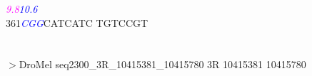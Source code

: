\documentclass[11pt,twoside,reqno,a4paper]{article}
\begin{document}
{\hspace*{4\charwidth}\hspace*{1\charwidth}\hspace*{17\charwidth}\textit{\textcolor{magenta}{9.8}}\hspace*{1\charwidth}\hspace*{1\charwidth}\hspace*{1\charwidth}\hspace*{1\charwidth}\hspace*{33\charwidth}\textit{\textcolor{blue}{10.6}}\hspace*{1\charwidth}\\
361\hspace*{1\charwidth}\textit{\textcolor{blue}{C}}\textit{\textcolor{blue}{G}}\textit{\textcolor{blue}{G}}CATCATC	TGTCCGT\\
\hspace*{4\charwidth}\hspace*{1\charwidth}\\
}
\\
$>$DroMel	seq2300\_3R\_10415381\_10415780	3R	10415381	10415780 \\
 \\
\end{document}
